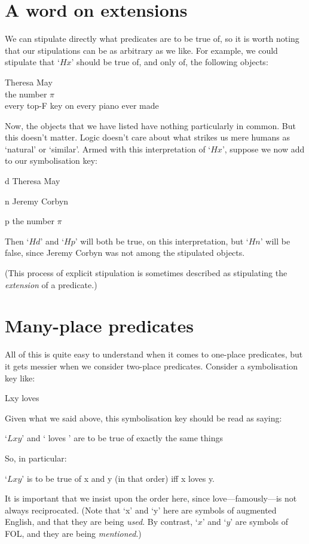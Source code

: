 \section{A word on extensions}
We can stipulate directly what predicates are to be true of, so it is worth noting that our stipulations can be as arbitrary as we like. For example, we could stipulate that `$Hx$' should be true of, and only of, the following objects:
	\begin{center}
		Theresa May\\
		the number $\pi$\\
		every top-F key on every piano ever made
	\end{center}
Now, the objects that we have listed have nothing particularly in common. But this doesn't matter. Logic doesn't care about what strikes us mere humans as `natural' or `similar'. Armed with this interpretation of `$Hx$', suppose we now add to our symbolisation key:
	\begin{ekey}
		\item[d] Theresa May
		\item[n] Jeremy Corbyn
		\item[p] the number $\pi$
	\end{ekey}
Then `$Hd$' and `$Hp$' will both be true, on this interpretation, but `$Hn$' will be false, since Jeremy Corbyn was not among the stipulated objects. 

(This process of explicit stipulation is sometimes described as stipulating the \emph{extension} of a predicate.)


\section{Many-place predicates}
All of this is quite easy to understand when it comes to one-place predicates, but it gets messier when we consider two-place predicates. Consider a symbolisation key like:
	\begin{ekey}
		\item[Lxy]  loves 
	\end{ekey}
Given what we said above, this symbolisation key should be read as saying:
	\begin{earg}
		\item[\textbullet] `$Lxy$' and ` loves ' are to be true of exactly the same things
	\end{earg}
So, in particular:
	\begin{earg}
		\item[\textbullet] `$Lxy$' is to be true of x and y (in that order) iff x loves y. 
	\end{earg}
It is important that we insist upon the order here, since love---famously---is not always reciprocated. (Note that `x' and `y' here are symbols of augmented English, and that they are being \emph{used}. By contrast, `$x$' and `$y$' are symbols of FOL, and they are being \emph{mentioned}.)

